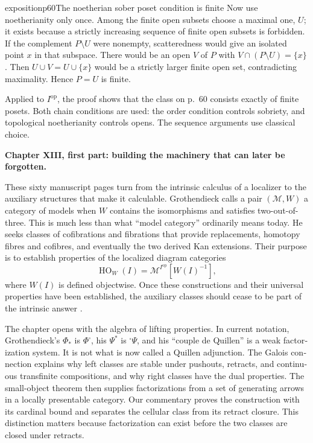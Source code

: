 \begin{dcomment}{exposition}{p60}{The noetherian sober poset condition is finite}
Now use noetherianity only once. Among the finite open subsets choose a maximal one, $U$; it exists because a strictly increasing sequence of finite open subsets is forbidden. If the complement $P\setminus U$ were nonempty, scatteredness would give an isolated point $x$ in that subspace. There would be an open $V$ of $P$ with $V\cap(P\setminus U)=\{x\}$. Then $U\cup V=U\cup\{x\}$ would be a strictly larger finite open set, contradicting maximality. Hence $P=U$ is finite.

Applied to $I^{\mathrm{op}}$, the proof shows that the class on p.~60 consists exactly of finite posets. Both chain conditions are used: the order condition controls sobriety, and topological noetherianity controls opens. The sequence arguments use classical choice.
\end{dcomment}
\begin{otherlanguage}{english}

\noindent\textbf{Chapter XIII, first part: building the machinery that can later be forgotten.}

These sixty manuscript pages turn from the intrinsic calculus of a
localizer to the auxiliary structures that make it calculable. Grothendieck
calls a pair $(\mathcal M,W)$ a category of models when $W$ contains the
isomorphisms and satisfies two-out-of-three. This is much less than what
``model category'' ordinarily means today. He seeks classes of cofibrations
and fibrations that provide replacements, homotopy fibres and cofibres, and
eventually the two derived Kan extensions. Their purpose is to establish
properties of the localized diagram categories
\[
 \operatorname{HO}_W(I)
   =\mathcal M^{I^{\mathrm{op}}}[W(I)^{-1}],
\]
where $W(I)$ is defined objectwise. Once these constructions and their
universal properties have been established, the auxiliary classes should
cease to be part of the intrinsic answer
\citep[manuscript pp.~12--14]{Grothendieck1990XIII}.

The chapter opens with the algebra of lifting properties. In current
notation, Grothendieck's $\Phi_*$ is $\Phi^{\square}$, his $\Psi^*$ is
${}^{\square}\Psi$, and his ``couple de Quillen'' is a weak factorization
system. It is not what is now called a Quillen adjunction. The Galois
connection explains why left classes are stable under pushouts, retracts,
and continuous transfinite compositions, and why right classes have the
dual properties. The small-object theorem then supplies factorizations
from a set of generating arrows in a locally presentable category. Our
commentary proves the construction with its cardinal bound and separates
the cellular class from its retract closure. This distinction matters
because factorization can exist before the two classes are closed under
retracts.


\end{otherlanguage}
